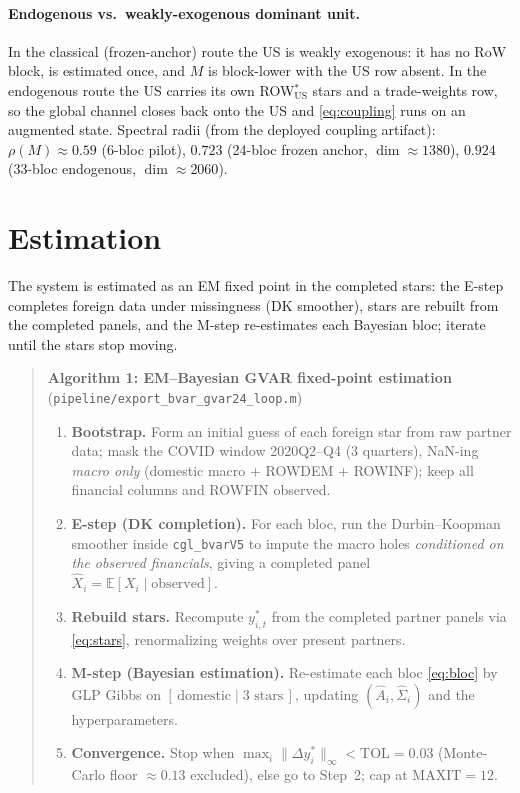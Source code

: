 \documentclass[11pt]{article}
\newcommand{\E}{\mathbb{E}}
\begin{document}
\paragraph{Endogenous vs.\ weakly-exogenous dominant unit.} In the classical (frozen-anchor) route the
US is weakly exogenous: it has no RoW block, is estimated once, and $M$ is block-lower with the US row
absent. In the endogenous route the US carries its own ROW$^{*}_\text{US}$ stars and a trade-weights
row, so the global channel closes back onto the US and \eqref{eq:coupling} runs on an augmented state.
Spectral radii (from the deployed coupling artifact): $\rho(M)\approx0.59$ (6-bloc pilot),
$0.723$ (24-bloc frozen anchor, $\dim\approx 1380$), $0.924$ (33-bloc endogenous, $\dim\approx 2060$).

\section{Estimation}

The system is estimated as an EM fixed point in the completed stars: the E-step completes foreign data
under missingness (DK smoother), stars are rebuilt from the completed panels, and the M-step
re-estimates each Bayesian bloc; iterate until the stars stop moving.

\begin{quote}
\noindent\textbf{Algorithm 1: EM--Bayesian GVAR fixed-point estimation}\\
(\texttt{pipeline/export\_bvar\_gvar24\_loop.m})
\begin{enumerate}
  \item \textbf{Bootstrap.} Form an initial guess of each foreign star from raw partner data; mask
        the COVID window 2020Q2--Q4 ($3$ quarters), NaN-ing \emph{macro only}
        (domestic macro $+$ ROWDEM $+$ ROWINF); keep all financial columns and ROWFIN observed.
  \item \textbf{E-step (DK completion).} For each bloc, run the Durbin--Koopman smoother inside
        \texttt{cgl\_bvarV5} to impute the macro holes \emph{conditioned on the observed financials},
        giving a completed panel $\widehat X_i = \E[X_i \mid \text{observed}]$.
  \item \textbf{Rebuild stars.} Recompute $y^{*}_{i,t}$ from the completed partner panels via
        \eqref{eq:stars}, renormalizing weights over present partners.
  \item \textbf{M-step (Bayesian estimation).} Re-estimate each bloc \eqref{eq:bloc} by GLP Gibbs on
        $[\,\text{domestic}\mid \text{3 stars}\,]$, updating $(\widehat A_i,\widehat\Sigma_i)$ and the
        hyperparameters.
  \item \textbf{Convergence.} Stop when $\max_i\lVert \Delta y^{*}_i\rVert_\infty < \text{TOL}=0.03$
        (Monte-Carlo floor $\approx 0.13$ excluded), else go to Step~2; cap at $\text{MAXIT}=12$.
\end{enumerate}
\end{quote}
\end{document}
